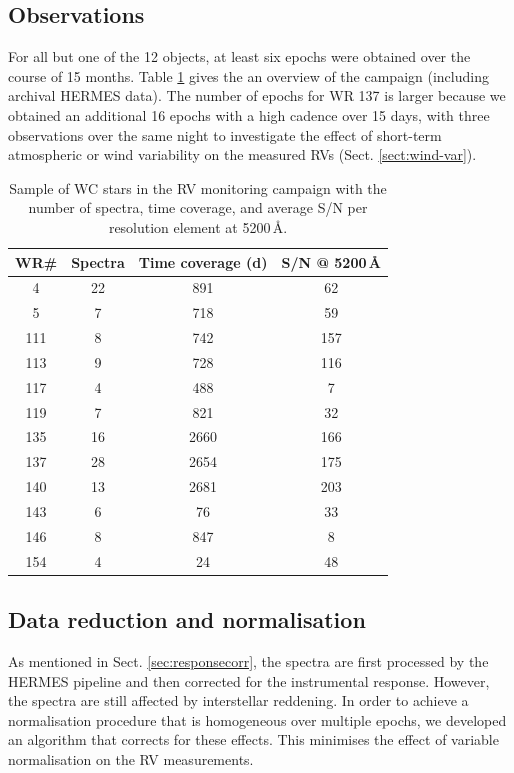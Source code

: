\subsection{Observations}
For all but one of the 12 objects, at least six epochs were obtained over the course of 15 months. Table \ref{tab:epochs} gives the an overview of the campaign (including archival HERMES data). The number of epochs for WR 137 is larger because we obtained an additional 16 epochs with a high cadence over 15 days, with three observations over the same night to investigate the effect of short-term atmospheric or wind variability on the measured RVs (Sect. \ref{sect:wind-var}).
\begin{table}
\centering
\caption{Sample of WC stars in the RV monitoring campaign with the number of spectra, time coverage, and average S/N per resolution element at 5200\,\r{A}.}
\begin{tabular}{cccc}
\hline \hline
WR\# & Spectra & Time coverage (d) & S/N @ 5200\,\r{A} \\ \hline
4 & 22 & 891 & 62 \\
5 & 7 & 718 & 59 \\
111 & 8 & 742 & 157 \\
113 & 9 & 728 & 116 \\
117 & 4 & 488 & 7 \\
119 & 7 & 821 & 32 \\
135 & 16 & 2660 & 166 \\
137 & 28 & 2654 & 175 \\
140 & 13 & 2681 & 203 \\
143 & 6 & 76 & 33 \\
146 & 8 & 847 & 8 \\
154 & 4 & 24 & 48 \\ \hline
\end{tabular}
\label{tab:epochs}
\end{table}

\subsection{Data reduction and normalisation}
As mentioned in Sect. \ref{sec:responsecorr}, the spectra are first processed by the HERMES pipeline and then corrected for the instrumental response. However, the spectra are still affected by interstellar reddening. In order to achieve a normalisation procedure that is homogeneous over multiple epochs, we developed an algorithm that corrects for these effects. This minimises the effect of variable normalisation on the RV measurements.

